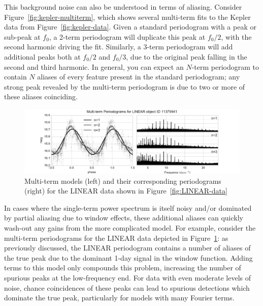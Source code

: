 \documentclass[preprint]{aastex}
\newcommand{\fig}[1]{Figure~\ref{fig:#1}}
\newcommand{\figlabel}[1]{\label{fig:#1}}
\begin{document}
This background noise can also be understood in terms of aliasing.
Consider \fig{kepler-multiterm}, which shows several multi-term fits to the
Kepler data from \fig{kepler-data}.
Given a standard periodogram with a peak or sub-peak at $f_0$,
a 2-term periodogram will duplicate this peak at $f_0 / 2$,
with the second harmonic driving the fit.
Similarly, a 3-term periodogram will add additional peaks both at
$f_0 / 2$ and $f_0 / 3$, due to the original peak falling in the second and
third harmonic.
In general, you can expect an $N$-term periodogram to contain $N$ aliases of
every feature present in the standard periodogram; any strong peak revealed
by the multi-term periodogram is due to two or more of these aliases coinciding.

\begin{figure}[ht]
  \centering
  \includegraphics[width=\textwidth]{fig22_LINEAR_multiterm}
  \caption{Multi-term models (left) and their corresponding periodograms (right)
    for the LINEAR data shown in \fig{LINEAR-data}
    \figlabel{LINEAR-multiterm}}
\end{figure}

In cases where the single-term power spectrum is itself noisy and/or dominated
by partial aliasing due to window effects, these additional aliases can
quickly wash-out any gains from the more complicated model.
For example, consider the multi-term periodograms for the LINEAR data
depicted in \fig{LINEAR-multiterm}: as previously discussed,
the LINEAR periodogram contains a number of aliases of the true peak due
to the dominant 1-day signal in the window function.
Adding terms to this model only compounds this problem, increasing the number of
spurious peaks at the low-frequency end.
For data with even moderate levels of noise, chance coincidences of these
peaks can lead to spurious detections which dominate the true peak, particularly
for models with many Fourier terms.
\end{document}
